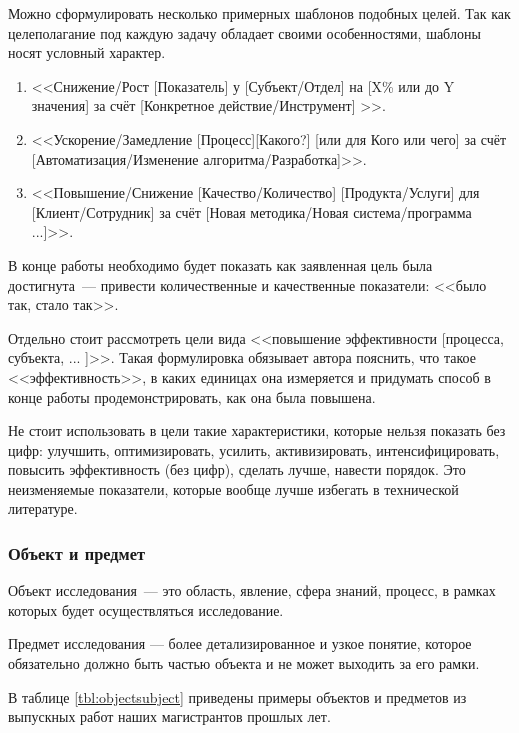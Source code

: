 Можно сформулировать несколько примерных шаблонов подобных целей. Так как  целеполагание под каждую задачу обладает своими особенностями, шаблоны носят условный характер.
\begin{enumerate}
	\item <<Снижение/Рост [Показатель] у [Субъект/Отдел] на [X\% или до Y значения] за счёт [Конкретное действие/Инструмент] >>.
	\item <<Ускорение/Замедление [Процесс][Какого?]  [или для Кого или чего] за счёт [Автоматизация/Изменение алгоритма/Разработка]>>.
	\item <<Повышение/Снижение [Качество/Количество] [Продукта/Услуги] для [Клиент/Сотрудник] за счёт [Новая методика/Новая система/программа ...]>>.
\end{enumerate} 

В конце работы необходимо будет показать как заявленная цель была достигнута~--- привести количественные и качественные показатели: <<было так, стало так>>.

Отдельно стоит рассмотреть цели вида <<повышение эффективности [процесса, субъекта, ... ]>>. Такая формулировка обязывает автора пояснить, что такое <<эффективность>>, в каких единицах она измеряется и придумать способ в конце работы продемонстрировать, как она была повышена.

Не стоит использовать в цели такие характеристики, которые нельзя показать без цифр: улучшить, оптимизировать\footnotemark, усилить, активизировать, интенсифицировать, повысить эффективность (без цифр), сделать лучше, навести порядок. Это неизменяемые показатели, которые вообще лучше избегать в технической литературе. 


\subsubsection{Объект и предмет}

Объект исследования~--- это область, явление, сфера знаний, процесс, в рамках которых будет осуществляться исследование.

Предмет исследования –-- более детализированное и узкое понятие, которое обязательно должно быть частью объекта и не может выходить за его рамки. 

В таблице \ref{tbl:objectsubject} приведены примеры объектов и предметов из выпускных работ наших магистрантов прошлых лет. 
 
